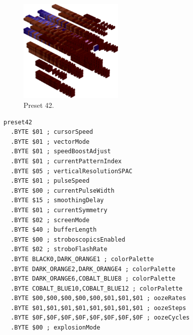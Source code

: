 \clearpage
\begin{minipage}[b]{0.48\linewidth}
\begin{figure}[H]                                                          
  \centering                                                             
  \begin{adjustbox}{width=5cm,center}                                   
  \includegraphics[width=5cm]{src/colorspace_presets/preset42-45.png}%
  \end{adjustbox}                                                        
\caption*{Preset 42.}                                           
\end{figure}                                                               
\end{minipage}
\hspace{0.1cm}
\begin{minipage}[b]{0.48\linewidth}                            
\begin{lstlisting}[basicstyle=\ttfamily\tiny]
preset42
  .BYTE $01 ; cursorSpeed
  .BYTE $01 ; vectorMode
  .BYTE $01 ; speedBoostAdjust
  .BYTE $01 ; currentPatternIndex
  .BYTE $05 ; verticalResolutionSPAC
  .BYTE $01 ; pulseSpeed
  .BYTE $00 ; currentPulseWidth
  .BYTE $15 ; smoothingDelay
  .BYTE $01 ; currentSymmetry
  .BYTE $02 ; screenMode
  .BYTE $40 ; bufferLength
  .BYTE $00 ; stroboscopicsEnabled
  .BYTE $02 ; stroboFlashRate
  .BYTE BLACK0,DARK_ORANGE1 ; colorPalette
  .BYTE DARK_ORANGE2,DARK_ORANGE4 ; colorPalette
  .BYTE DARK_ORANGE6,COBALT_BLUE8 ; colorPalette
  .BYTE COBALT_BLUE10,COBALT_BLUE12 ; colorPalette
  .BYTE $00,$00,$00,$00,$00,$01,$01,$01 ; oozeRates
  .BYTE $01,$01,$01,$01,$01,$01,$01,$01 ; oozeSteps
  .BYTE $0F,$0F,$0F,$0F,$0F,$0F,$0F,$0F ; oozeCycles
  .BYTE $00 ; explosionMode
\end{lstlisting}
\end{minipage}

\vspace*{0.3cm}

